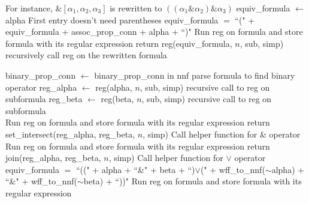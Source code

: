 \documentclass[runningheads]{llncs}
\begin{document}
\begin{algorithm}[H]
\begin{algorithmic}
        \Comment For instance, $\&[\alpha_1, \alpha_2, \alpha_3]$ is rewritten to $((\alpha_1 \& \alpha_2) \& \alpha_3)$
                \State equiv\_formula $\leftarrow$ alpha
                \Comment First entry doesn't need parentheses
            \Else
                \State equiv\_formula $=$ ``(" + equiv\_formula + assoc\_prop\_conn + alpha + ``)"
            \EndIf
        \EndFor
            \State Run reg on formula and store formula with its regular expression
        \EndIf
        \State return reg(equiv\_formula, $n$, sub, simp)
        \Comment recursively call reg on the rewritten formula
    \EndIf
\end{algorithmic}
\end{algorithm}
\begin{algorithm}[H]
\begin{algorithmic}
        \State binary\_prop\_conn $\leftarrow$ binary\_prop\_conn in nnf
        \Comment parse formula to find binary operator
        \State reg\_alpha $\leftarrow$ reg(alpha, $n$, sub, simp)
        \Comment recursive call to reg on subformula
        \State reg\_beta $\leftarrow$ reg(beta, $n$, sub, simp)
        \Comment recursive call to reg on subformula\\
                \State Run reg on formula and store formula with its regular expression
            \EndIf
            \State return set\_intersect(reg\_alpha, reg\_beta, $n$, simp)
            \Comment Call helper function for \& operator
        \EndIf\\
                \State Run reg on formula and store formula with its regular expression
            \EndIf
            \State return join(reg\_alpha, reg\_beta, $n$, simp)
            \Comment Call helper function for $\lor$ operator
        \EndIf\\
            \State equiv\_formula $=$ ``((" + alpha + ``\&" + beta + ``)$\lor$(" + wff\_to\_nnf($\scriptstyle{\sim}$alpha) + 
            \State ``\&" + wff\_to\_nnf($\scriptstyle{\sim}$beta) + ``))"
                \State Run reg on formula and store formula with its regular expression

\end{algorithmic}
\end{algorithm}
\end{document}
